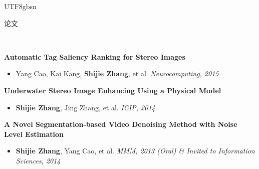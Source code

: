 \documentclass[3pt]{article}
\newenvironment{changemargin}[2]{%
  \begin{list}{}{%
    \setlength{\topsep}{0pt}%
    \setlength{\leftmargin}{#1}%
    \setlength{\rightmargin}{#2}%
    \setlength{\listparindent}{\parindent}%
    \setlength{\itemindent}{\parindent}%
    \setlength{\parsep}{\parskip}%
  }%
  \item[]}{\end{list}
}
\newcommand{\lineover}{
	\begin{changemargin}{-0.05in}{-0.05in}
		\vspace*{-8pt}
		\hrulefill \\
		\vspace*{-2pt}
	\end{changemargin}
}
\newcommand{\header}[1]{
	\begin{changemargin}{-0.5in}{-0.5in}
		{\Large \scshape{#1}}\\
  	\lineover
	\end{changemargin}
}
\newenvironment{body} {
	\vspace*{-16pt}
	\begin{changemargin}{-0.25in}{-0.5in}
  }	
	{\end{changemargin}
}
\begin{document}
\begin{CJK}{UTF8}{gbsn}

%	


 
	

\bigskip

\header{论文}

\begin{body}
	\vspace{18pt}	

	\textbf{ Automatic Tag Saliency Ranking for Stereo Images}
     \begin{itemize} \itemsep -0pt
	\item{Yang Cao, Kai Kang, \textbf{Shijie Zhang}, et al. } \hfill \emph{Neurocomputing, 2015  }
           \end{itemize}	

	\textbf{ Underwater Stereo Image Enhancing Using a Physical Model }
     \begin{itemize} \itemsep -0pt
	\item{\textbf{Shijie Zhang}, Jing Zhang, et al. } \hfill \emph{ICIP, 2014 }
           \end{itemize}	

	\textbf{ A Novel Segmentation-based Video Denoising Method with Noise Level Estimation }
     \begin{itemize} \itemsep -0pt
	\item{\textbf{Shijie Zhang}, Yang Cao, et al. } \hfill \emph{MMM, 2013 (Oral) \& Invited to Information Sciences, 2014  }
           \end{itemize}	

\end{body}

\end{CJK}
\end{document}
